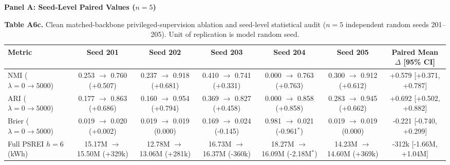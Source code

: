 \documentclass[
  journal]{IEEEtran}
\begin{document}
\begin{table}[!t]
\centering
\fontsize{8.0pt}{9.2pt}\selectfont
\setlength{\tabcolsep}{2.5pt}
\renewcommand{\arraystretch}{1.02}
\caption*{\textbf{Table A6c.} Clean matched-backbone privileged-supervision ablation and seed-level statistical audit ($n=5$ independent random seeds 201--205). Unit of replication is model random seed.}
%
\noindent\textbf{Panel A: Seed-Level Paired Values ($n=5$)}\par
\vspace{1mm}
\begin{tabular*}{\textwidth}{@{\extracolsep{\fill}}l c c c c c c@{}}
\toprule
Metric & Seed 201 & Seed 202 & Seed 203 & Seed 204 & Seed 205 & Paired Mean $\Delta$ [95\% CI] \\
\midrule
NMI ($\lambda=0 \to 5000$) & \shortstack{0.253 $\to$ 0.760\\(+0.507)} & \shortstack{0.237 $\to$ 0.918\\(+0.681)} & \shortstack{0.410 $\to$ 0.741\\(+0.331)} & \shortstack{0.000 $\to$ 0.763\\(+0.763)} & \shortstack{0.300 $\to$ 0.912\\(+0.612)} & +0.579 [+0.371, +0.787] \\
\addlinespace[1pt]
ARI ($\lambda=0 \to 5000$) & \shortstack{0.177 $\to$ 0.863\\(+0.686)} & \shortstack{0.160 $\to$ 0.954\\(+0.794)} & \shortstack{0.369 $\to$ 0.827\\(+0.458)} & \shortstack{0.000 $\to$ 0.858\\(+0.858)} & \shortstack{0.283 $\to$ 0.945\\(+0.662)} & +0.692 [+0.502, +0.882] \\
\addlinespace[1pt]
Brier ($\lambda=0 \to 5000$) & \shortstack{0.019 $\to$ 0.020\\(+0.002)} & \shortstack{0.019 $\to$ 0.019\\(0.000)} & \shortstack{0.169 $\to$ 0.024\\(-0.145)} & \shortstack{0.981 $\to$ 0.021\\(-0.961$^\ast$)} & \shortstack{0.019 $\to$ 0.019\\(0.000)} & -0.221 [-0.740, +0.299] \\
\addlinespace[1pt]
Full PSREI $h=6$ (kWh) & \shortstack{15.17M $\to$ 15.50M\\(+329k)} & \shortstack{12.78M $\to$ 13.06M\\(+281k)} & \shortstack{16.73M $\to$ 16.37M\\(-360k)} & \shortstack{18.27M $\to$ 16.09M\\(-2.18M$^\ast$)} & \shortstack{14.23M $\to$ 14.60M\\(+369k)} & -312k [-1.66M, +1.04M] \\

\end{tabular*}
\end{table}
\end{document}
